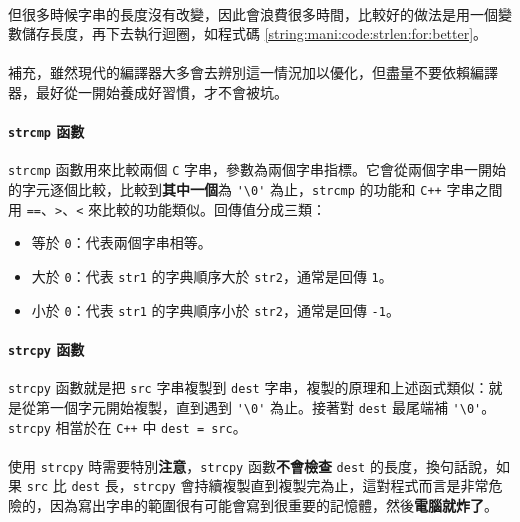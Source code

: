 \documentclass[12pt,a4paper,oneside]{article}
\begin{document}
\begin{CJK}{UTF8}{bkai}
\paragraph{}但很多時候字串的長度沒有改變，因此會浪費很多時間，比較好的做法是用一個變數儲存長度，再下去執行迴圈，如程式碼 \ref{string:mani:code:strlen:for:better}。
\paragraph{}補充，雖然現代的編譯器大多會去辨別這一情況加以優化，但盡量不要依賴編譯器，最好從一開始養成好習慣，才不會被坑。

\paragraph{\lstinline!strcmp! 函數}\lstinline!strcmp! 函數用來比較兩個 \texttt{C} 字串，參數為兩個字串指標。它會從兩個字串一開始的字元逐個比較，比較到\textbf{其中一個}為 \lstinline!'\0'! 為止，\lstinline!strcmp! 的功能和 \texttt{C++} 字串之間用 \lstinline!==!、\lstinline!>!、\lstinline!<! 來比較的功能類似。回傳值分成三類：

\begin{itemize}
\item 等於 \lstinline!0!：代表兩個字串相等。
\item 大於 \lstinline!0!：代表 \lstinline!str1! 的字典順序大於 \lstinline!str2!，通常是回傳 \lstinline!1!。
\item 小於 \lstinline!0!：代表 \lstinline!str1! 的字典順序小於 \lstinline!str2!，通常是回傳 \lstinline!-1!。
\end{itemize}

\paragraph{\lstinline!strcpy! 函數}\lstinline!strcpy! 函數就是把 \lstinline!src! 字串複製到 \lstinline!dest! 字串，複製的原理和上述函式類似：就是從第一個字元開始複製，直到遇到 \lstinline!'\0'! 為止。接著對 \lstinline!dest! 最尾端補 \lstinline!'\0'!。\lstinline!strcpy! 相當於在 \texttt{C++} 中 \lstinline!dest = src!。
\paragraph{}使用 \lstinline!strcpy! 時需要特別{\color{blue}\textbf{注意}}，\lstinline!strcpy! 函數{\color{red}\textbf{不會檢查}} \lstinline!dest! 的長度，換句話說，如果 \lstinline!src! 比 \lstinline!dest! 長，\lstinline!strcpy! 會持續複製直到複製完為止，這對程式而言是非常危險的，因為寫出字串的範圍很有可能會寫到很重要的記憶體，然後{\color{red}\textbf{電腦就炸了}}。

\end{CJK}
\end{document}
